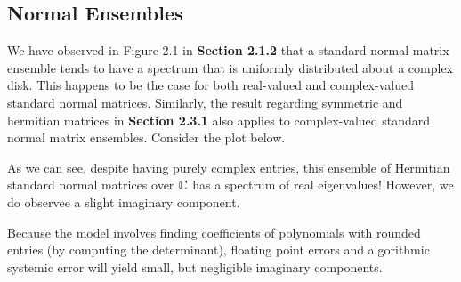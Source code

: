 \newpage
\subsection{Normal Ensembles}

%


We have observed in Figure 2.1 in \textbf{Section 2.1.2} that a standard normal matrix ensemble tends to have a spectrum that is uniformly distributed about a complex disk. This happens to be the case for both real-valued and complex-valued standard normal matrices. Similarly, the result regarding symmetric and hermitian matrices in \textbf{Section 2.3.1} also applies to complex-valued standard normal matrix ensembles. Consider the plot below.


As we can see, despite having purely complex entries, this ensemble of Hermitian standard normal matrices over $\mathbb{C}$ has a spectrum of real eigenvalues!
However, we do observee a slight imaginary component.

\begin{remark}
Because the model involves finding coefficients of polynomials with rounded entries (by computing the determinant),
floating point errors and algorithmic systemic error will yield small, but negligible imaginary components.
\end{remark}
